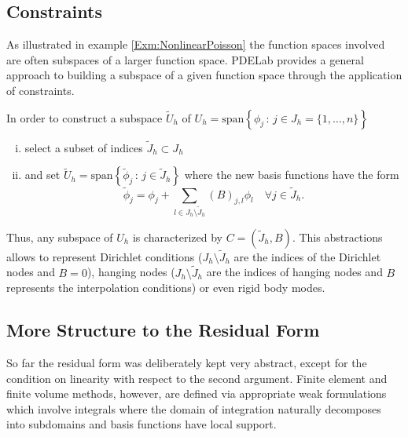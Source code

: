 \documentclass[a4paper,12pt]{article}
\theoremstyle{definition}
\begin{document}
\subsection*{Constraints}

As illustrated in example \ref{Exm:NonlinearPoisson} the function spaces
involved are often subspaces of a larger function space. PDELab provides
a general approach to building a subspace of a given function space through
the application of constraints. 

In order to construct a subspace $\tilde{U}_h$ 
of $U_h = \text{span}\left\{\phi_j \,:\, j\in J_h=\{1,\ldots,n\}\right\}$ 
\begin{enumerate}[i)]
\item select a subset of indices $\tilde{J}_h\subset J_h$
\item and set $\tilde{U}_h = \text{span}\left\{\tilde\phi_j \,:\, j\in \tilde{J}_h\right\}$ 
where the new basis functions have the form 
\begin{equation*}
\tilde\phi_j = \phi_j + \sum_{l\in J_h\setminus\tilde{J}_h} (B)_{j,l} \phi_l \quad \forall j\in \tilde{J}_h.
\end{equation*}
\end{enumerate}
Thus, any subspace of $U_h$ is characterized by $C=(\tilde{J}_h,B)$.
This abstractions allows to represent Dirichlet conditions ($J_h\setminus\tilde{J}_h$
are the indices of the Dirichlet nodes and $B=0$), hanging nodes
($J_h\setminus\tilde{J}_h$ are the indices of hanging nodes and $B$ represents
the interpolation conditions) or even rigid body modes.

\subsection*{More Structure to the Residual Form}

So far the residual form was deliberately kept very abstract, except for
the condition on linearity with respect to the second argument.
Finite element and finite volume methods, however, are defined via
appropriate weak formulations which involve integrals where the domain
of integration naturally decomposes into subdomains and basis functions
have local support. 
\end{document}
